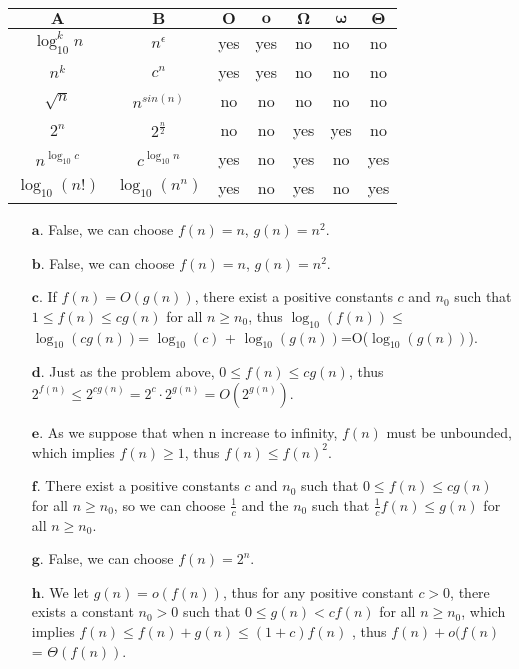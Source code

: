 \documentclass[a4paper, justified]{tufte-handout}
\newcommand{\lg}{\log_{10}}
\begin{document}
\begin{solution}
  \begin{tabular}[t]{cc|c|c|c|c|c|}
    $\bm{A}$ & $\bm{B}$ & $\bm{O}$ & $\bm{o}$ & $\bm{\Omega}$ & $\bm{\omega}$ & $\bm{\Theta}$\\
    \hline
    $\lg^{k}n$ & $n^{\epsilon}$ &yes &yes &no &no &no\\
    \hline
    $n^{k}$ & $c^{n} $ &yes &yes& no& no&no\\
    \hline
    $\sqrt{n}$ & $n^{sin(n)}$ &no &no &no &no &no\\
    \hline 
    $2^{n} $& $2^{\frac{n}{2}}$ & no &no &yes &yes &no \\
    \hline
    $n^{\lg c}$ & $c^{\lg n}$ &yes &no &yes &no &yes\\
    \hline
    $\lg{(n!)}$ & $\lg(n^{n})$ & yes &no &yes &no &yes\\
    \hline

\end{tabular}
\end{solution}


\begin{problem}[TC Problem $3-4$]
\end{problem}

\begin{solution}
\begin{enumerate}
    \item [$\bm{a.}$]False, we can choose  $f(n) = n$, $g(n) = n^{2}$.
    \item [$\bm{b.}$]False, we can choose $f(n) = n$, $g(n) = n^{2}$.
    \item [$\bm{c.}$]If $f(n) = O(g(n))$, there exist a positive constants $c$ and $n_0$ such that $1 \le f(n) \le cg(n)$ for all $n \ge n_0$, thus $\lg(f(n)) \le$ $\lg(cg(n))$= $\lg(c)$ + $\lg(g(n))$=O($\lg(g(n))$).
    \item [$\bm{d.}$]Just as the problem above, $0 \le f(n) \le cg(n)$, thus $2^{f(n)} \le 2^{cg(n)} = 2^{c} \cdot 2^{g(n)} = O(2^{g(n)})$.
    \item [$\bm{e.}$] As we suppose that when n increase to infinity, $f(n)$ must be unbounded, which implies $f(n) \ge 1$, thus $f(n) \le f(n)^{2}$.
    \item [$\bm{f.}$] There exist a positive constants $c$ and $n_0$ such that $0 \le f(n) \le cg(n)$ for all $n \ge n_0$, so we can choose $\frac{1}{c}$ and the $n_0$ such that $\frac{1}{c}f(n) \le g(n)$ for all $n \ge n_0$.
    \item [$\bm{g.}$] False, we can choose $f(n) = 2^{n}$.
    \item[$\bm{h.}$]We let $g(n) = o(f(n))$, thus for any positive constant $c > 0$, there exists a constant $n_0 > 0$ such that $0 \le g(n) < cf(n) $ for all $n \ge n_0$, which implies $f(n) \le f(n) + g(n) \le (1+c)f(n) $ , thus $f(n) + o(f(n)$ = $\Theta(f(n))$.
\end{enumerate} 
\end{solution}


\end{document}
